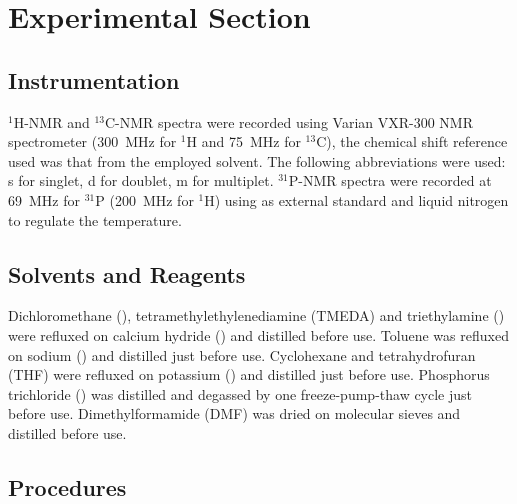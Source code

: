 \chapter{Experimental Section}
\section{Instrumentation}
$^1$H-NMR and $^{13}$C-NMR spectra were recorded using Varian VXR-300 NMR spectrometer (300~MHz for $^1$H and 75~MHz for $^{13}$C), the chemical shift reference used was that from the employed solvent. The following abbreviations were used: s for singlet, d for doublet, m for multiplet.
$^{31}$P-NMR spectra were recorded at 69~MHz for $^{31}$P (200~MHz for $^1$H) using  as external standard and liquid nitrogen to regulate the temperature.


\section{Solvents and Reagents}
Dichloromethane (), tetramethylethylenediamine (TMEDA) and triethylamine () were refluxed on calcium hydride () and distilled before use.
Toluene was refluxed on sodium () and distilled just before use.
Cyclohexane and tetrahydrofuran (THF) were refluxed on potassium () and distilled just before use.
Phosphorus trichloride () was distilled and degassed by one freeze-pump-thaw cycle just before use.
Dimethylformamide (DMF) was dried on molecular sieves and distilled before use.

\section{Procedures}


